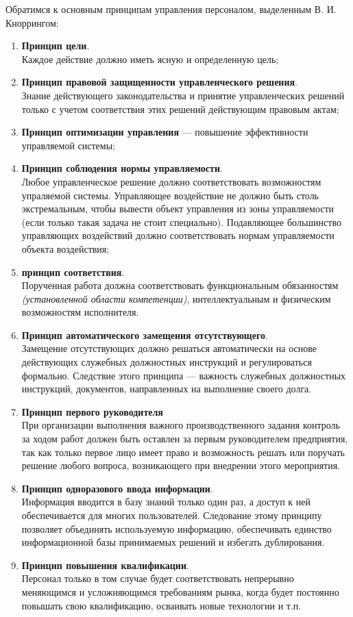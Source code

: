 \documentclass[a4paper,12pt,oneside,final]{extarticle}
\numberwithin{equation}{section}
\begin{document}
Обратимся к основным принципам управления персоналом, выделенным В. И. Кноррингом:
\begin{enumerate}
	\item \textbf{Принцип цели}. \\ 
	Каждое действие должно иметь ясную и определенную цель;
	\item \textbf{Принцип правовой защищенности управленческого решения}. \\ 
	Знание действующего законодательства и принятие управленческих решений только с учетом соответствия этих решений действующим правовым актам;
	\item \textbf{Принцип оптимизации управления} --- повышение эффективности управляемой системы;
	\item \textbf{Принцип соблюдения нормы управляемости}. \\ 
	Любое управленческое решение должно соответствовать возможностям упраляемой системы. 
	Управляющее воздействие не должно быть столь экстремальным, чтобы вывести объект управления из зоны управляемости (если только такая задача не стоит специально). 
	Подавляющее большинство управляющих воздействий должно соответствовать нормам управляемости объекта воздействия;
	\item \textbf{принцип соответствия}. \\
	Порученная работа должна соответствовать функциональным обязанностям \textit{(установленной области компетенции)}, интеллектуальным и физическим возможностям исполнителя.
	\item \textbf{Принцип автоматического замещения отсутствующего}. \\ 
	Замещение отсутствующих должно решаться автоматически на основе действующих служебных должностных инструкций и регулироваться формально. 
	Следствие этого принципа --- важность служебных должностных инструкций, документов, направленных на выполнение своего долга.
	\item \textbf{Принцип первого руководителя} \\ 
	При организации выполнения важного производственного задания контроль за ходом работ должен быть оставлен за первым руководителем предприятия, так как только первое лицо имеет право и возможность решать или поручать решение любого вопроса, возникающего при внедрении этого мероприятия.
	\item \textbf{Принцип одноразового ввода информации}. \\ 
	Информация вводится в базу знаний только один раз, а доступ к ней обеспечивается для многих пользователей. 
	Следование этому принципу позволяет объединять используемую информацию, обеспечивать единство информационной базы принимаемых решений и избегать дублирования.
	\item \textbf{Принцип повышения квалификации}. \\
	Персонал только в том случае будет соответствовать непрерывно меняющимся и усложняющимся требованиям рынка, когда будет постоянно повышать свою квалификацию, осваивать новые технологии и т.п.
\end{enumerate}
\end{document}
